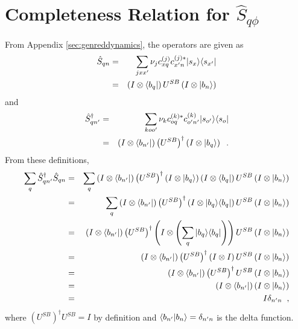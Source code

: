 \section{Completeness Relation for $\hat{S}_{q\phi}$}
\label{sec:Scomrelation}

From Appendix \ref{sec:genreddynamics}, the operators are given as
\begin{eqnarray*}
\hat{S}_{qn} &=& \sum_{jxx^\prime} \nu_j c_{xq}^{(j)} c_{x^\prime n}^{(j)*} |s_x\rangle\langle s_{x^\prime}|\\
&=& \left( I\otimes \left\langle b_q\right|\right)U^{SB}\left(I\otimes \left|b_n\right\rangle\right)
\end{eqnarray*}
and
\begin{eqnarray*}
\hat{S}_{qn^\prime}^\dagger &=& \sum_{koo^\prime} \nu_k c_{oq}^{(k)*} c_{o^\prime n^\prime}^{(k)} |s_{o^\prime}\rangle\langle s_{o}|\\
&=& \left( I\otimes \left\langle b_{n^\prime}\right|\right)\left(U^{SB}\right)^\dagger\left(I\otimes \left|b_q\right\rangle\right)\;\;.
\end{eqnarray*}
From these definitions,
\begin{eqnarray*}
\sum_q \hat{S}_{qn^\prime}^\dagger \hat{S}_{qn} &=& \sum_q \left( I\otimes \left\langle b_{n^\prime}\right|\right)\left(U^{SB}\right)^\dagger\left(I\otimes \left|b_q\right\rangle\right)\left( I\otimes \left\langle b_q\right|\right)U^{SB}\left(I\otimes \left|b_n\right\rangle\right)\\
&=&\sum_q \left( I\otimes \left\langle b_{n^\prime}\right|\right)\left(U^{SB}\right)^\dagger\left(I\otimes |b_q\rangle\langle b_q|\right)U^{SB}\left(I\otimes \left|b_n\right\rangle\right)\\
&=&\left( I\otimes \left\langle b_{n^\prime}\right|\right)\left(U^{SB}\right)^\dagger\left(I\otimes \left(\sum_q |b_q\rangle\langle b_q|\right)\right)U^{SB}\left(I\otimes \left|b_n\right\rangle\right)\\
&=& \left( I\otimes \left\langle b_{n^\prime}\right|\right)\left(U^{SB}\right)^\dagger\left(I\otimes I\right)U^{SB}\left(I\otimes \left|b_n\right\rangle\right)\\
&=& \left( I\otimes \left\langle b_{n^\prime}\right|\right)\left(U^{SB}\right)^\dagger U^{SB}\left(I\otimes \left|b_n\right\rangle\right)\\
&=& \left( I\otimes \left\langle b_{n^\prime}\right|\right)\left(I\otimes \left|b_n\right\rangle\right)\\
&=& I\delta_{n^\prime n}\;\;,
\end{eqnarray*}
where $\left(U^{SB}\right)^\dagger U^{SB}=I$ by definition and $\langle b_{n^\prime}|b_n\rangle=\delta_{n^\prime n}$ is the delta function.

